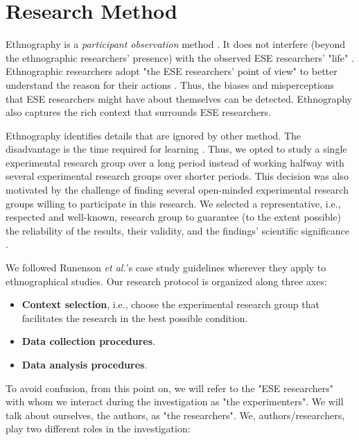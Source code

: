 \section{Research Method}\label{sec-research-method}

Ethnography is a \textit{participant observation} method . It does not interfere (beyond the ethnographic researchers' presence) with the observed ESE researchers' "life" \cite{Sharp-2016-Ethnographic-Studies-ESE}. Ethnographic researchers adopt "the ESE researchers' point of view" to better understand the reason for their actions \cite[pp. 55-56]{Outhwaite-2007-sage}. Thus, the biases and misperceptions that ESE researchers might have about themselves can be detected. Ethnography also captures the rich context that surrounds ESE researchers.

Ethnography identifies details that are ignored by  other method. The disadvantage is the time required for learning \cite{Sharp-2016-Ethnographic-Studies-ESE}. Thus, we opted to study a single experimental research group over a long period instead of working halfway with several experimental research groups over shorter periods. This decision was also motivated by the challenge of finding several open-minded experimental research groups willing to participate in this research. We selected a representative, i.e., respected and well-known, research group to guarantee (to the extent possible) the reliability of the results, their validity, and the findings' scientific significance \cite{sjoberg-2007-future-empical-methods}.

We followed Runenson \textit{et al.}'s case study guidelines \cite{Runenson-2012-case-study-SE} wherever they apply to ethnographical studies. Our research protocol is organized along three axes:

\begin{itemize}
	\item \textbf{Context selection}, i.e., choose the experimental research group that facilitates the research in the best possible condition.
    \item \textbf{Data collection procedures}.
    \item \textbf{Data analysis procedures}.
\end{itemize}

To avoid confusion, from this point on, we will refer to the "ESE researchers" with whom we interact during the investigation as "the experimenters". We will talk about ourselves, the authors, as "the researchers". We, authors/researchers, play two different roles in the investigation:

